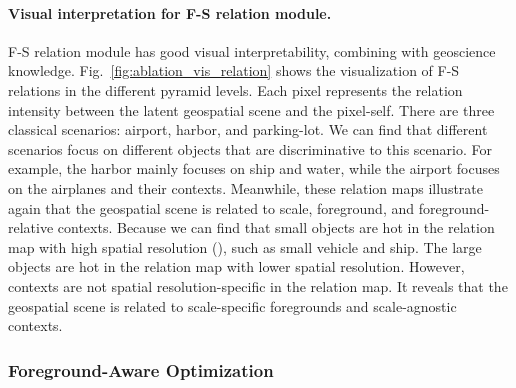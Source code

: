 \documentclass[10pt,twocolumn,letterpaper]{article}
\begin{document}
\begin{figure*}
   \caption{Visualization of F-S relation heatmap in the different pyramid levels. (a) original images. (b) object segmentation results. (c)-(f) images with F-S relation heatmaps in the different pyramid level.  denotes ``output stride'' defined in FPN. For convenient visualization, we resize these relation maps to corresponding image sizes.
   Legend: Scene 1 (\textcolor[rgb]{0,0.5,1}{plane}, \textcolor[rgb]{0,0.5,0.5}{large vehicle}, \textcolor[rgb]{0,0,0.5}{small vehicle}), 
   Scene 2 (\textcolor[rgb]{0,0,0.5}{small vehicle}, \textcolor[rgb]{0,0.39,0.608}{harbor}, \textcolor[rgb]{0,0,0.25}{ship}),
   Scene 3 (\textcolor[rgb]{0,0,0.5}{small vehicle}, 
   \textcolor[rgb]{0, 0.25, 0.5}{tennis court}, \textcolor[rgb]{0, 0.25, 0}{baseball diamond}), in a row order.}
   \label{fig:ablation_vis_relation}
\end{figure*}

\paragraph{Visual interpretation for F-S relation module.}
F-S relation module has good visual interpretability, combining with geoscience knowledge.
Fig.~\ref{fig:ablation_vis_relation} shows the visualization of F-S relations in the different pyramid levels.
Each pixel represents the relation intensity between the latent geospatial scene and the pixel-self.
There are three classical scenarios: airport, harbor, and parking-lot.
We can find that different scenarios focus on different objects that are discriminative to this scenario.
For example, the harbor mainly focuses on ship and water, while the airport focuses on the airplanes and their contexts.
Meanwhile, these relation maps illustrate again that the geospatial scene is related to scale, foreground, and foreground-relative contexts.
Because we can find that small objects are hot in the relation map with high spatial resolution (), such as small vehicle and ship.
The large objects are hot in the relation map with lower spatial resolution.
However, contexts are not spatial resolution-specific in the relation map.
It reveals that the geospatial scene is related to scale-specific foregrounds and scale-agnostic contexts.



\subsubsection{Foreground-Aware Optimization}
\end{document}
